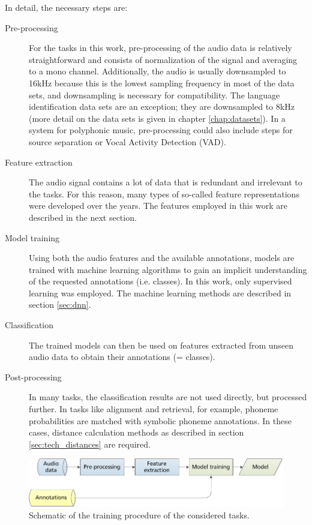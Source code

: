         In detail, the necessary steps are:
        \begin{description}
            \item[Pre-processing] For the tasks in this work, pre-processing of the audio data is relatively straightforward and consists of normalization of the signal and averaging to a mono channel. 
            Additionally, the audio is usually downsampled to 16kHz because this is the lowest sampling frequency in most of the data sets, and downsampling is necessary for compatibility. 
            The language identification data sets are an exception; they are downsampled to 8kHz (more detail on the data sets is given in chapter \ref{chap:datasets}).
            In a system for polyphonic music, pre-processing could also include steps for source separation or Vocal Activity Detection (VAD). 

            \item[Feature extraction] The audio signal contains a lot of data that is redundant and irrelevant to the tasks. 
            For this reason, many types of so-called feature representations were developed over the years. 
            The features employed in this work are described in the next section.

            \item[Model training] Using both the audio features and the available annotations, models are trained with machine learning algorithms to gain an implicit understanding of the requested annotations (i.e. classes). 
            In this work, only supervised learning was employed. 
            The machine learning methods are described in section \ref{sec:dnn}.

            \item[Classification] The trained models can then be used on features extracted from unseen audio data to obtain their annotations (= classes).

            \item[Post-processing] In many tasks, the classification results are not used directly, but processed further. 
            In tasks like alignment and retrieval, for example, phoneme probabilities are matched with symbolic phoneme annotations. 
            In these cases, distance calculation methods as described in section \ref{sec:tech_distances} are required.
        \end{description}

        \begin{figure}
            \begin{center}
                \includegraphics[width=1\textwidth]{figures/process_training.png}
                \caption{Schematic of the training procedure of the considered tasks.}
                \label{fig:process_training}
            \end{center}
        \end{figure}

